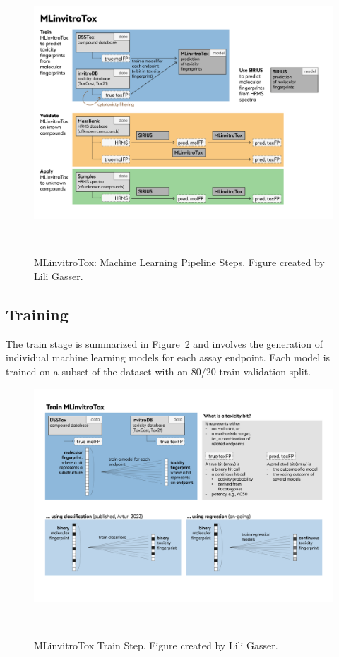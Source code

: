 \begin{figure}[h]
    \centering
    \includegraphics[width=1.0\textwidth]{figures/Project_overview.png}
    \caption{MLinvitroTox: Machine Learning Pipeline Steps. Figure created by Lili Gasser.}
~\label{fig:Project_overview}
\end{figure}

\subsection{Training}
The train stage is summarized in Figure~\ref{fig:Project_overview_train} and involves the generation of individual machine learning models for each assay endpoint. Each model is trained on a subset of the dataset with an 80/20 train-validation split. 

\begin{figure}[h]
    \centering
    \includegraphics[width=1.0\textwidth]{figures/Project_overview_train.png}
    \caption{MLinvitroTox Train Step. Figure created by Lili Gasser.}
~\label{fig:Project_overview_train}
\end{figure}

